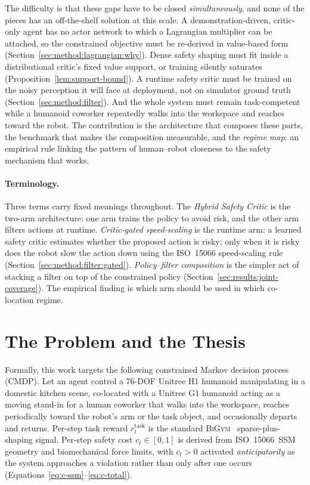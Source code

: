 \documentclass[11pt,a4paper]{report}
\newcommand{\ssm}{SSM}
\newcommand{\iso}{ISO~15066}
\newcommand{\bigym}{\textsc{BiGym}}
\begin{document}
The difficulty is that these gaps have to be closed
\emph{simultaneously}, and none of the pieces has an off-the-shelf
solution at this scale. A demonstration-driven, critic-only agent has
no actor network to which a Lagrangian multiplier can be attached, so
the constrained objective must be re-derived in value-based form
(Section~\ref{sec:method:lagrangian:why}). Dense safety shaping must
fit inside a distributional critic's fixed value support, or training
silently saturates (Proposition~\ref{lem:support-bound}). A runtime
safety critic must be trained on the noisy perception it will face at
deployment, not on simulator ground truth
(Section~\ref{sec:method:filter}). And the whole system must remain
task-competent while a humanoid coworker repeatedly walks into the
workspace and reaches toward the robot. The contribution is the
architecture that composes these parts, the benchmark that makes the
composition measurable, and the \emph{regime map}: an empirical rule
linking the pattern of human--robot closeness to the safety mechanism
that works.

\paragraph{Terminology.}
Three terms carry fixed meanings throughout. The \emph{Hybrid Safety
Critic} is the two-arm architecture: one arm trains the policy to avoid
risk, and the other arm filters actions at runtime. \emph{Critic-gated
speed-scaling} is the runtime arm: a learned safety critic estimates
whether the proposed action is risky; only when it is risky does the
robot slow the action down using the \iso{} speed-scaling rule
(Section~\ref{sec:method:filter:gated}). \emph{Policy--filter
composition} is the simpler act of stacking a filter on top of the
constrained policy (Section~\ref{sec:results:joint-coverage}). The
empirical finding is which arm should be used in which co-location
regime.

\section{The Problem and the Thesis}
\label{sec:intro:problem}

Formally, this work targets the following constrained Markov
decision process (CMDP). Let an agent control a 76-DOF Unitree H1
humanoid manipulating in a domestic kitchen scene, co-located with a
Unitree G1 humanoid acting as a moving stand-in for a human coworker that walks
into the workspace, reaches periodically toward the robot's arm or the task object, and occasionally departs and
returns. Per-step task reward $r^{\mathrm{task}}_t$ is the standard
\bigym{}~\cite{chernyadev2024bigym} sparse-plus-shaping signal.
Per-step safety cost $c_t \in [0,1]$ is derived from \iso{}~\ssm{}
geometry and biomechanical force limits, with $c_t > 0$ activated
\emph{anticipatorily} as the system approaches a violation rather
than only after one occurs (Equations~\ref{eq:c-ssm}--\ref{eq:c-total}).
\end{document}
